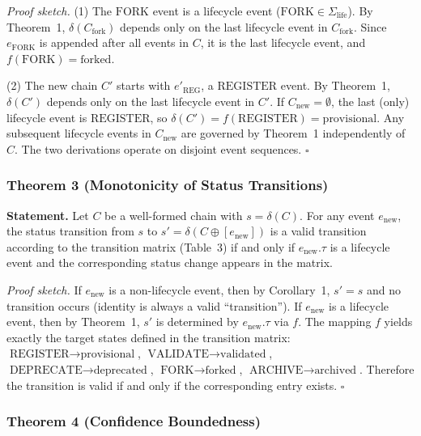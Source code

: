 \emph{Proof sketch.} (1) The $\text{FORK}$ event is a lifecycle event ($\text{FORK} \in \Sigma_{\text{life}}$). By Theorem~1, $\delta(C_{\text{fork}})$ depends only on the last lifecycle event in $C_{\text{fork}}$. Since $e_{\text{FORK}}$ is appended after all events in $C$, it is the last lifecycle event, and $f(\text{FORK}) = \text{forked}$.

(2) The new chain $C'$ starts with $e'_{\text{REG}}$, a $\text{REGISTER}$ event. By Theorem~1, $\delta(C')$ depends only on the last lifecycle event in $C'$. If $C_{\text{new}} = \emptyset$, the last (only) lifecycle event is $\text{REGISTER}$, so $\delta(C') = f(\text{REGISTER}) = \text{provisional}$. Any subsequent lifecycle events in $C_{\text{new}}$ are governed by Theorem~1 independently of $C$. The two derivations operate on disjoint event sequences. $\square$

\subsubsection{Theorem 3 (Monotonicity of Status Transitions)}\label{c.6.4-theorem-3-monotonicity-of-status-transitions}

\textbf{Statement.} Let $C$ be a well-formed chain with $s = \delta(C)$. For any event $e_{\text{new}}$, the status transition from $s$ to $s' = \delta(C \oplus [e_{\text{new}}])$ is a valid transition according to the transition matrix (Table~3) if and only if $e_{\text{new}}.\tau$ is a lifecycle event and the corresponding status change appears in the matrix.

\emph{Proof sketch.} If $e_{\text{new}}$ is a non-lifecycle event, then by Corollary~1, $s' = s$ and no transition occurs (identity is always a valid ``transition''). If $e_{\text{new}}$ is a lifecycle event, then by Theorem~1, $s'$ is determined by $e_{\text{new}}.\tau$ via $f$. The mapping $f$ yields exactly the target states defined in the transition matrix: $\text{REGISTER} \to \text{provisional}$, $\text{VALIDATE} \to \text{validated}$, $\text{DEPRECATE} \to \text{deprecated}$, $\text{FORK} \to \text{forked}$, $\text{ARCHIVE} \to \text{archived}$. Therefore the transition is valid if and only if the corresponding entry exists. $\square$

\subsubsection{Theorem 4 (Confidence Boundedness)}\label{c.6.5-theorem-4-confidence-boundedness}

